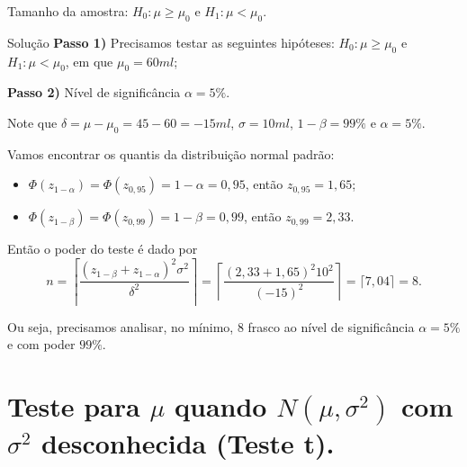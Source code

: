 \documentclass[8pt]{beamer}
\begin{document}
\begin{frame}{Tamanho da amostra: $H_0:\mu \geq \mu_0$ e $H_1: \mu < \mu_0$.}

\begin{block}{Solução}
	\textbf{Passo 1)} Precisamos testar as seguintes hipóteses: $H_0: \mu \geq \mu_0$ e $H_1: \mu < \mu_0$, em que $\mu_0=60ml$;
	
	\textbf{Passo 2)} Nível de significância $\alpha=5\%$.
	
	Note que $\delta=\mu-\mu_0=45-60=-15ml$, $\sigma=10ml$, $1-\beta=99\%$ e $\alpha = 5\%$.
	
	Vamos encontrar os quantis da distribuição normal padrão:
	\begin{itemize}
		\item $\Phi\left( z_{1-\alpha} \right) = \Phi\left( z_{0,95} \right) =1- \alpha = 0,95$, então  $z_{0,95} = 1,65$;
		\item $\Phi\left( z_{1-\beta} \right) = \Phi\left( z_{0,99} \right) =1- \beta = 0,99$, então  $z_{0,99} = 2,33$.
	\end{itemize} 
	
	Então o poder do teste é dado por
	$$n=\left\lceil \frac{(z_{1-\beta} + z_{1-\alpha})^2 \sigma^2}{\delta^2} \right\rceil = \left\lceil \frac{(2,33 + 1,65)^2 10^2}{(-15)^2} \right\rceil = \lceil 7,04 \rceil = 8.$$
	
	Ou seja, precisamos analisar, no mínimo, $8$ frasco ao nível de significância $\alpha=5\%$ e com poder $99\%$.
\end{block}

\end{frame}

\section{Teste para $\mu$ quando $N(\mu, \sigma^2)$ com $\sigma^2$ desconhecida (Teste t).}
\end{document}
